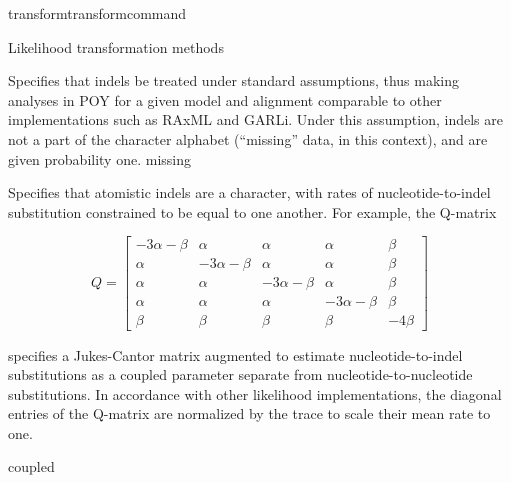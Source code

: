 \begin{command}{transform}{transformcommand}
\begin{arguments}
\begin{argumentgroup}{Likelihood transformation methods}
{                    \begin{description}

                            {Specifies that indels be treated under standard
                            assumptions, thus making analyses in POY for a given
                            model and alignment comparable to other
                            implementations such as RAxML and GARLi. Under this
                            assumption, indels are not a part of the character
                            alphabet (``missing'' data, in this context), and
                            are given probability one.}
                            {missing}

                            {Specifies that atomistic indels are a character,
                            with rates of nucleotide-to-indel substitution
                            constrained to be equal to one another. For example,
                            the Q-matrix

                            \begin{equation*}
                                Q =
                                    \begin{bmatrix}
                                        -3 \alpha - \beta & \alpha & \alpha & \alpha & \beta \\
                                        \alpha & -3 \alpha - \beta & \alpha & \alpha & \beta \\
                                        \alpha & \alpha & -3 \alpha - \beta & \alpha & \beta \\
                                        \alpha & \alpha & \alpha & -3 \alpha - \beta & \beta \\
                                        \beta & \beta & \beta & \beta & -4 \beta
                                \end{bmatrix}
                            \end{equation*}

                            specifies a Jukes-Cantor matrix augmented to
                            estimate nucleotide-to-indel substitutions as a
                            coupled parameter separate from
                            nucleotide-to-nucleotide substitutions. In
                            accordance with other likelihood implementations,
                            the diagonal entries of the Q-matrix are normalized
                            by the trace to scale their mean rate to one.}
                            {coupled}


\end{description}}
\end{argumentgroup}
\end{arguments}
\end{command}
